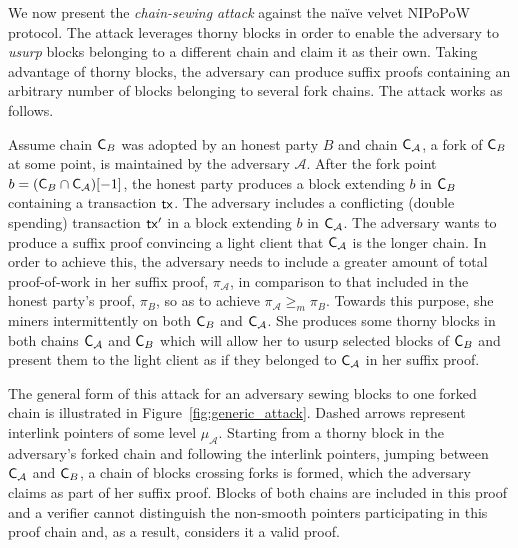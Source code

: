 We now present the \emph{chain-sewing attack} against the na\"ive velvet NIPoPoW
protocol. The attack leverages thorny blocks in order to enable the adversary to
\emph{usurp} blocks belonging to a different chain and claim it as their own.
Taking advantage of thorny blocks, the adversary can produce suffix proofs
containing an arbitrary number of blocks belonging to several fork chains. The
attack works as follows.

Assume chain $\mathsf{C}_B$ was adopted by an honest party $B$ and chain $\mathsf{C}_\mathcal{A}$, a fork of $\mathsf{C}_B$ at some point, is maintained by the adversary $\mathcal{A}$. After the fork point $b = (\mathsf{C}_B \cap \mathsf{C}_\mathcal{A})[-1]$, the honest party produces a block extending $b$ in $\mathsf{C}_B$ containing a transaction $\mathsf{tx}$. The adversary includes a conflicting (double spending) transaction $\mathsf{tx}'$ in a block extending $b$ in $\mathsf{C}_\mathcal{A}$.
The adversary wants to produce a suffix proof convincing a light client that $\mathsf{C}_\mathcal{A}$ is the longer chain. In order to achieve this, the adversary needs to include a greater amount of total proof-of-work in her suffix proof, $\pi_\mathcal{A}$, in comparison to that included in the honest party's proof, $\pi_B$, so as to achieve $\pi_\mathcal{A} \geq_m \pi_B$. Towards this purpose, she miners intermittently on both $\mathsf{C}_B$ and $\mathsf{C}_\mathcal{A}$. She produces some thorny blocks in both chains $\mathsf{C}_\mathcal{A}$ and $\mathsf{C}_B$ which will allow her to usurp selected blocks of $\mathsf{C}_B$ and present them to the light client as if they belonged to $\mathsf{C}_\mathcal{A}$ in her suffix proof.

The general form of this attack for an adversary sewing blocks to one forked chain is illustrated in Figure~\ref{fig:generic_attack}. Dashed arrows represent interlink pointers of some level $\mu_\mathcal{A}$. Starting from a thorny block in the adversary's forked chain and following the interlink pointers, jumping between $\mathsf{C}_\mathcal{A}$ and $\mathsf{C}_B$, a chain of blocks crossing forks is formed, which the adversary claims as part of her suffix proof. Blocks of both chains are included in this proof and a verifier cannot distinguish the non-smooth pointers participating in this proof chain and, as a result, considers it a valid proof.

